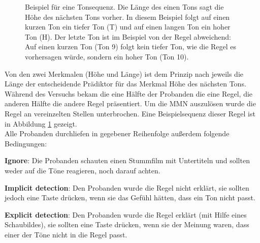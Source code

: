 \documentclass[doc,a4paper,12pt]{apa6}
\begin{document}
\begin{figure}[t]
  \centering
  \begin{minipage}{\textwidth}
    \setlength{\fboxsep}{.05\textwidth}
    \vspace{10pt}
    \caption[Beispiel für eine Tonsequenz]{Beispiel für eine Tonsequenz. Die Länge des einen Tons sagt die Höhe des nächsten Tons vorher. In diesem Beispiel folgt auf einen kurzen Ton ein tiefer Ton (T) und auf einen langen Ton ein hoher Ton (H). Der letzte Ton ist im Beispiel von der Regel abweichend: Auf einen kurzen Ton (Ton 9) folgt kein tiefer Ton, wie die Regel es vorhersagen würde, sondern ein hoher Ton (Ton 10).}
    \label{stimuli}
  \end{minipage}
\end{figure}

Von den zwei Merkmalen (Höhe und Länge) ist dem Prinzip nach jeweils die Länge der entscheidende Prädiktor für das Merkmal Höhe des nächsten Tons. Während des Versuchs bekam die eine Hälfte der Probanden die eine Regel, die anderen Hälfte die andere Regel präsentiert. Um die MMN auszulösen wurde die Regel an vereinzelten Stellen unterbrochen. Eine Beispielsequenz dieser Regel ist in Abbildung \ref{stimuli} gezeigt.\\
Alle Probanden durchliefen in gegebener Reihenfolge außerdem folgende Bedingungen:

\begin{compactitem}
  \item \textbf{Ignore}: Die Probanden schauten einen Stummfilm mit Untertiteln und sollten weder auf die Töne reagieren, noch darauf achten.
  \item \textbf{Implicit detection}: Den Probanden wurde die Regel nicht erklärt, sie sollten jedoch eine Taste drücken, wenn sie das Gefühl hätten, dass ein Ton nicht passt.
  \item \textbf{Explicit detection}: Den Probanden wurde die Regel erklärt (mit Hilfe eines Schaubildes), sie sollten eine Taste drücken, wenn sie der Meinung waren, dass einer der Töne nicht in die Regel passt.
\end{compactitem}
\end{document}
